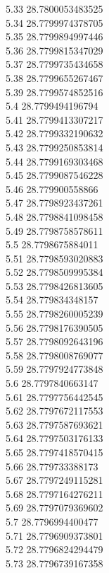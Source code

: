 {5.33	28.7800053483525\\
5.34	28.7799974378705\\
5.35	28.7799894997446\\
5.36	28.7799815347029\\
5.37	28.7799735434658\\
5.38	28.7799655267467\\
5.39	28.7799574852516\\
5.4	28.7799494196794\\
5.41	28.7799413307217\\
5.42	28.7799332190632\\
5.43	28.7799250853814\\
5.44	28.7799169303468\\
5.45	28.7799087546228\\
5.46	28.779900558866\\
5.47	28.7798923437261\\
5.48	28.7798841098458\\
5.49	28.7798758578611\\
5.5	28.7798675884011\\
5.51	28.7798593020883\\
5.52	28.7798509995384\\
5.53	28.7798426813605\\
5.54	28.779834348157\\
5.55	28.7798260005239\\
5.56	28.7798176390505\\
5.57	28.7798092643196\\
5.58	28.7798008769077\\
5.59	28.7797924773848\\
5.6	28.7797840663147\\
5.61	28.7797756442545\\
5.62	28.7797672117553\\
5.63	28.7797587693621\\
5.64	28.7797503176133\\
5.65	28.7797418570415\\
5.66	28.779733388173\\
5.67	28.7797249115281\\
5.68	28.7797164276211\\
5.69	28.7797079369602\\
5.7	28.7796994400477\\
5.71	28.7796909373801\\
5.72	28.7796824294479\\
5.73	28.7796739167358\\
}
